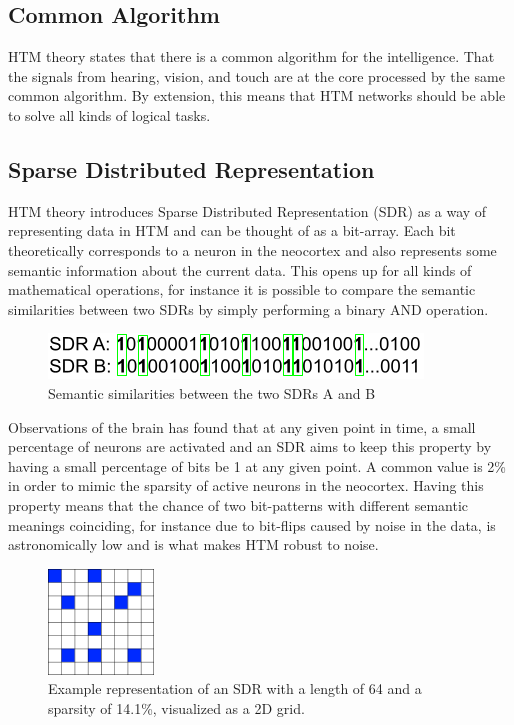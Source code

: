 \subsection{Common Algorithm}
HTM theory states that there is a common algorithm for the intelligence. That the signals from hearing, vision, and touch are at the core processed by the same common algorithm. By extension, this means that HTM networks should be able to solve all kinds of logical tasks.
\subsection{Sparse Distributed Representation}
HTM theory introduces Sparse Distributed Representation (SDR) as a way of representing data in HTM and can be thought of as a bit-array. Each bit theoretically corresponds to a neuron in the neocortex and also represents some semantic information about the current data. This opens up for all kinds of mathematical operations, for instance it is possible to compare the semantic similarities between two SDRs by simply performing a binary AND operation.
\begin{figure}[H]
    \centering
    \includegraphics{resources/related_works/sdr-semantics.png}
    \caption{Semantic similarities between the two SDRs A and B}
    \label{fig:sdr_semantics}
\end{figure}
Observations of the brain has found that at any given point in time, a small percentage of neurons are activated and an SDR aims to keep this property by having a small percentage of bits be 1 at any given point. A common value is 2\% in order to mimic the sparsity of active neurons in the neocortex. Having this property means that the chance of two bit-patterns with different semantic meanings coinciding, for instance due to bit-flips caused by noise in the data, is astronomically low and is what makes HTM robust to noise.
\begin{figure}[H]
    \centering
    \includegraphics[width=0.25\textwidth]{resources/related_works/SDR.png}
    \caption{Example representation of an SDR with a length of 64 and a sparsity of 14.1\%, visualized as a 2D grid.}
\end{figure}
